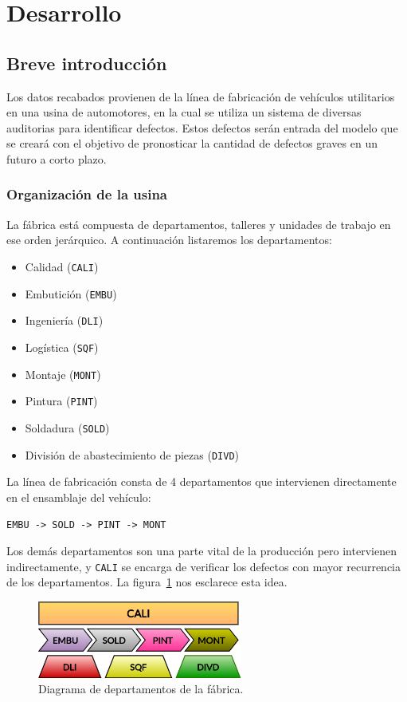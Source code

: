 \documentclass[a4paper,12pt]{article}
\begin{document}
\section{Desarrollo}

\subsection{Breve introducción}
Los datos recabados provienen de la línea de fabricación de vehículos utilitarios en una usina de automotores, en la cual se utiliza un sistema de diversas auditorias para identificar defectos. Estos defectos serán entrada del modelo que se creará con el objetivo de pronosticar la cantidad de defectos graves en un futuro a corto plazo.

\subsubsection{Organización de la usina}
La fábrica está compuesta de departamentos, talleres y unidades de trabajo en ese orden jerárquico. A continuación listaremos los departamentos:

\begin{itemize}[noitemsep, topsep=2pt]
	\item Calidad (\texttt{CALI})
	\item Embutición (\texttt{EMBU})
	\item Ingeniería (\texttt{DLI})
	\item Logística (\texttt{SQF})
	\item Montaje (\texttt{MONT})
	\item Pintura (\texttt{PINT})
	\item Soldadura (\texttt{SOLD})
	\item División de abastecimiento de piezas (\texttt{DIVD})
\end{itemize}

La línea de fabricación consta de 4 departamentos que intervienen directamente en el ensamblaje del vehículo:

\texttt{EMBU -> SOLD -> PINT -> MONT}

Los demás departamentos son una parte vital de la producción pero intervienen indirectamente, y \texttt{CALI} se encarga de verificar los defectos con mayor recurrencia de los departamentos. La figura~\ref{fig:dptodiagram} nos esclarece esta idea.

\begin{figure}[H]
	\begin{center}				
	\includegraphics[width=0.6\textwidth]{usina.png}
  	\caption{Diagrama de departamentos de la fábrica.}
  	\label{fig:dptodiagram}
  	\end{center}
\end{figure}
\end{document}
